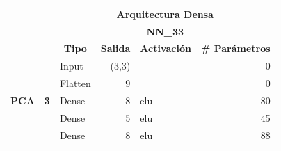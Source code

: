 \begin{table}[H]
\centering
\begin{center}
\begin{tabular}{ll|l|r|l|r|}
\cline{3-6}
                                                    &                             & \multicolumn{4}{c|}{\textbf{Arquitectura Densa}}                                                                                                           \\ \cline{3-6} 
                                                    &                             & \multicolumn{4}{c|}{\textbf{NN\_33}}                                                                                                                                   \\ \cline{3-6} 
                                                    &                             & \multicolumn{1}{c|}{\textbf{Tipo}} & \multicolumn{1}{c|}{\textbf{Salida}} & \multicolumn{1}{c|}{\textbf{Activaci\'{o}n}} & \multicolumn{1}{l|}{\textbf{\# Par\'{a}metros}} \\ \hline
\multicolumn{1}{|l|}{\multirow{7}{*}{\textbf{PCA}}} & \multirow{7}{*}{\textbf{3}} & Input                              & (3,3)                                &                                          & 0                                           \\ \cline{3-6} 
\multicolumn{1}{|l|}{}                              &                             & Flatten                            & 9                                    &                                          & 0                                           \\ \cline{3-6} 
\multicolumn{1}{|l|}{}                              &                             & Dense                              & 8                                   & elu                                     & 80                                          \\ \cline{3-6} 
\multicolumn{1}{|l|}{}                              &                             & Dense                              & 5                                   & elu                                     & 45                                          \\ \cline{3-6} 
\multicolumn{1}{|l|}{}                              &                             & Dense                              & 8                                    & elu                                     & 88                                          \\ \cline{3-6} 

\end{tabular}
\end{center}
\end{table}
